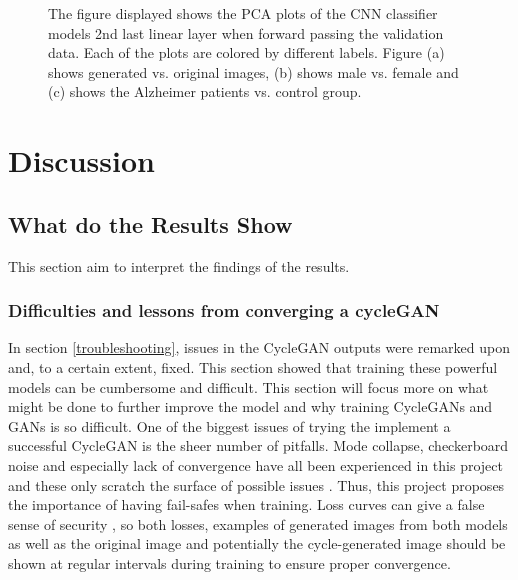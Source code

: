 \documentclass[12pt, fleqn, titlepage]{article}
\newcommand{\1}[1]{\mathds{1}\left[#1\right]}
\begin{document}
\begin{figure}[H]
	\caption{The figure displayed shows the PCA plots of the CNN classifier models 2nd last linear layer when forward passing the validation data. Each of the plots are colored by different labels. Figure (a) shows generated vs. original images, (b) shows male vs. female and (c) shows the Alzheimer patients vs. control group. }
		\label{fig:pca_not_gen}
\end{figure}



\section{Discussion}\label{discussion}

\subsection{What do the Results Show}\label{discussionOfResults}
This section aim to interpret the findings of the results. 

\subsubsection{Difficulties and lessons from converging a cycleGAN}
In section \ref{troubleshooting}, issues in the CycleGAN outputs were remarked upon and, to a certain extent, fixed. This section showed that training these powerful models can be cumbersome and difficult. This section will focus more on what might be done to further improve the model and why training CycleGANs and GANs is so difficult. One of the biggest issues of trying the implement a successful CycleGAN is the sheer number of pitfalls. Mode collapse, checkerboard noise and especially lack of convergence have all been experienced in this project and these only scratch the surface of possible issues \cite{hard_to_train, mode_collapse_MLM}. Thus, this project proposes the importance of having fail-safes when training. Loss curves can give a false sense of security \cite{towardsdatascience_losses, better_cycles_losses}, so both losses, examples of generated images from both models as well as the original image and potentially the cycle-generated image should be shown at regular intervals during training to ensure proper convergence.
\end{document}
